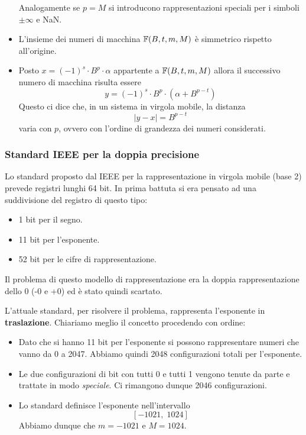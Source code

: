 \begin{observation}
\begin{itemize}
		      Analogamente se $p = M$ si introducono rappresentazioni speciali per i simboli $\pm \infty$
		      e NaN.
		\item L'insieme dei numeri di macchina $\mathbb{F} (B, t, m, M)$ è simmetrico rispetto all'origine.
		\item Posto $x = (-1)^s \cdot B^p \cdot \alpha$ appartente a $\mathbb{F}(B, t, m, M)$ allora il
		      successivo numero di macchina risulta essere
		      \[ y = (-1)^s \cdot B^p \cdot (\alpha + B^{p-t}) \]
		      Questo ci dice che, in un sistema in virgola mobile, la distanza
		      \[ |y - x| = B^{p-t} \]
		      varia con $p$, ovvero con l'ordine di grandezza dei numeri considerati.
	\end{itemize}
\end{observation}

\subsubsection{Standard IEEE per la doppia precisione}
Lo standard proposto dal IEEE per la rappresentazione in virgola mobile (base 2) prevede registri lunghi 64 bit.
In prima battuta si era pensato ad una suddivisione del registro di questo tipo:
\begin{itemize}
	\item 1 bit per il segno.
	\item 11 bit per l'esponente.
	\item 52 bit per le cifre di rappresentazione.
\end{itemize}
Il problema di questo modello di rappresentazione era la doppia rappresentazione dello 0 (-0 e +0) ed è stato
quindi scartato.

L'attuale standard, per risolvere il problema, rappresenta l'esponente in \textbf{traslazione}. Chiariamo meglio
il concetto procedendo con ordine:
\begin{itemize}
	\item Dato che si hanno 11 bit per l'esponente si possono rappresentare numeri che vanno da 0 a 2047. Abbiamo
	      quindi 2048 configurazioni totali per l'esponente.
	\item Le due configurazioni di bit con tutti 0 e tutti 1 vengono tenute da parte e trattate in modo
	      \emph{speciale}. Ci rimangono dunque 2046 configurazioni.
	\item Lo standard definisce l'esponente nell'intervallo
	      \[ [ -1021, \; 1024 ] \]
	      Abbiamo dunque che $m = -1021$ e $M = 1024$.
\end{itemize}
